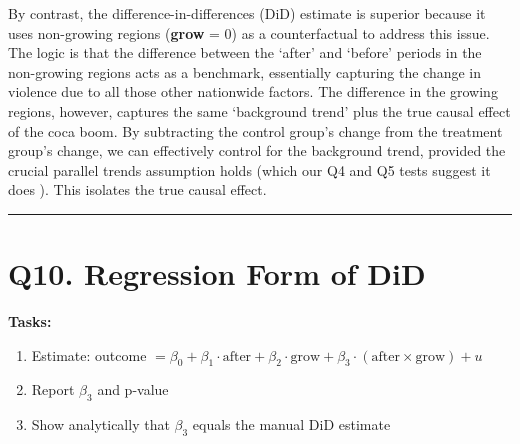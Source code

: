 \documentclass[
]{article}
\providecommand{\tightlist}{%
  \setlength{\itemsep}{0pt}\setlength{\parskip}{0pt}}
\begin{document}
By contrast, the difference-in-differences (DiD) estimate is superior
because it uses non-growing regions (\textbf{grow} = 0) as a
counterfactual to address this issue. The logic is that the difference
between the `after' and `before' periods in the non-growing regions acts
as a benchmark, essentially capturing the change in violence due to all
those other nationwide factors. The difference in the growing regions,
however, captures the same `background trend' plus the true causal
effect of the coca boom. By subtracting the control group's change from
the treatment group's change, we can effectively control for the
background trend, provided the crucial parallel trends assumption holds
(which our Q4 and Q5 tests suggest it does ). This isolates the true
causal effect.

\begin{center}\rule{0.5\linewidth}{0.5pt}\end{center}

\section{Q10. Regression Form of DiD}\label{q10.-regression-form-of-did}

\textbf{Tasks:}

\begin{enumerate}
\def\labelenumi{\arabic{enumi}.}
\tightlist
\item
  Estimate: outcome
  \(= \beta_0 + \beta_1 \cdot \text{after} + \beta_2 \cdot \text{grow} + \beta_3 \cdot (\text{after} \times \text{grow}) + u\)
\item
  Report \(\beta_3\) and p-value
\item
  Show analytically that \(\beta_3\) equals the manual DiD estimate
\end{enumerate}
\end{document}
